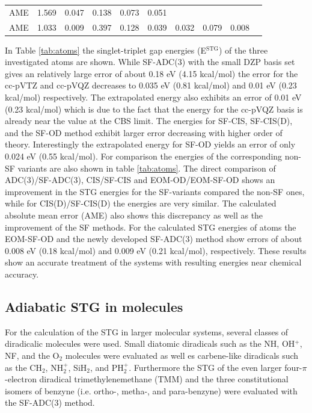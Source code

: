 \documentclass[aip,graphicx,amsmath,reprint]{revtex4-1}
\begin{document}
\begin{table}
\begin{ruledtabular}
\begin{tabular}{lccccccccc}
AME\footnotemark[4]&1.569&0.047&0.138&0.073&0.051\\
AME\footnotemark[5]&1.033&0.009&0.397&0.128&0.039&0.032&0.079&0.008\\
\end{tabular}
\end{ruledtabular}
\end{table}

In Table \ref{tab:atoms} the singlet-triplet gap energies (E$^{{\text{STG}}}$) of the three investigated atoms are shown. While SF-ADC(3) with the small DZP basis set gives an relatively large error of about 0.18 eV (4.15 kcal/mol) the error for the cc-pVTZ and cc-pVQZ decreases to 0.035 eV (0.81 kcal/mol) and 0.01 eV (0.23 kcal/mol) respectively. The extrapolated energy also exhibits an error of 0.01 eV (0.23 kcal/mol) which is due to the fact that the energy for the cc-pVQZ basis is already near the value at the CBS limit. The energies for SF-CIS, SF-CIS(D), and the SF-OD method exhibit larger error decreasing with higher order of theory. Interestingly the extrapolated energy for SF-OD yields an error of only 0.024 eV (0.55 kcal/mol). For comparison the energies of the corresponding non-SF variants are also shown in table \ref{tab:atoms}. The direct comparison of ADC(3)/SF-ADC(3), CIS/SF-CIS and EOM-OD/EOM-SF-OD shows an improvement in the STG energies for the SF-variants compared the non-SF ones, while for CIS(D)/SF-CIS(D) the energies are very similar. The calculated absolute mean error (AME) also shows this discrepancy as well as the improvement of the SF methods. For the calculated STG energies of atoms the EOM-SF-OD and the newly developed SF-ADC(3) method show errors of about 0.008 eV (0.18 kcal/mol) and 0.009 eV (0.21 kcal/mol), respectively. These results show an accurate treatment of the systems with resulting energies near chemical accuracy.




\subsection{Adiabatic STG in molecules}
For the calculation of the STG in larger molecular systems, several classes of diradicalic molecules were used. Small diatomic diradicals such as the NH, OH$^+$, NF, and the O$_2$ molecules were evaluated as well es carbene-like diradicals such as the CH$_2$, NH$_2^+$, SiH$_2$, and PH$_2^+$. Furthermore the STG of the even larger four-$\pi$-electron diradical trimethylenemethane (TMM) and the three constitutional isomers of benzyne (i.e. ortho-, metha-, and para-benzyne) were evaluated with the SF-ADC(3) method.
\end{document}
